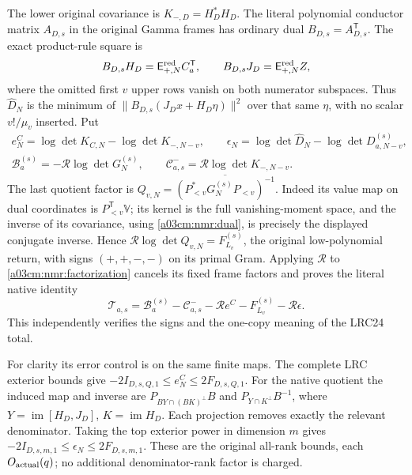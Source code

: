 \documentclass[11pt,a4paper]{article}
\begin{document}
The lower original covariance is $K_{-,D}=H_D^*H_D$.
The literal polynomial conductor matrix $A_{D,s}$ in the original
Gamma frames has ordinary dual $B_{D,s}=A_{D,s}^{\mathsf T}$.
The exact product-rule square is
\[
B_{D,s}H_D=\mathsf E_{+,N}^{\rm red}C_a^{\mathsf T},
\qquad
B_{D,s}J_D=\mathsf E_{+,N}^{\rm red}Z,
\]
where the omitted first $v$ upper rows vanish on both numerator
subspaces. Thus $\widehat D_N$ is the minimum of
$\|B_{D,s}(J_Dx+H_D\eta)\|^2$ over that same $\eta$, with no
scalar $v!/\mu_v$ inserted.
Put
\begin{equation}\tag{NMR8}\label{a03cm:nmr:corrections}
\begin{gathered}
e_N^C=\log\det K_{C,N}-\log\det K_{-,N-v},\qquad
\epsilon_N=\log\det\widehat D_N-\log\det D_{a,N-v}^{(s)},\\
\mathcal B_a^{(s)}=-\mathcal R\log\det G_N^{(s)},\qquad
\mathcal C^-_{a,s}=\mathcal R\log\det K_{-,N-v}.
\end{gathered}
\end{equation}
The last quotient factor is
$Q_{v,N}=\overline{(P_{<v}^*G_N^{(s)}P_{<v})^{-1}}$.
Indeed its value map on dual coordinates is
$P_{<v}^{\mathsf T}\mathbb V$; its kernel is the full
vanishing-moment space, and the inverse of its covariance, using
\eqref{a03cm:nmr:dual}, is precisely the displayed conjugate inverse.
Hence
$\mathcal R\log\det Q_{v,N}=F_{L_v}^{(s)}$, the original
low-polynomial return, with signs $(+,+,-,-)$ on its primal Gram.
Applying $\mathcal R$ to \eqref{a03cm:nmr:factorization} cancels its fixed
frame factors and proves the literal native identity
\begin{equation}\tag{NMR9}\label{a03cm:nmr:total}
\mathcal T_{a,s}
=\mathcal B_a^{(s)}-\mathcal C^-_{a,s}
 -\mathcal R e^C-F_{L_v}^{(s)}-\mathcal R\epsilon .
\end{equation}
This independently verifies the signs and the one-copy meaning of
the LRC24 total.

For clarity its error control is on the same finite maps. The complete
LRC exterior bounds give
$-2I_{D,s,Q,1}\leq e_N^C\leq2F_{D,s,Q,1}$.
For the native quotient the induced map and inverse are
$P_{B Y\cap(BK)^\perp}B$ and $P_{Y\cap K^\perp}B^{-1}$,
where $Y=\operatorname{im}[H_D,J_D]$, $K=\operatorname{im}H_D$.
Each projection removes exactly the relevant denominator. Taking the
top exterior power in dimension $m$ gives
$-2I_{D,s,m,1}\leq\epsilon_N\leq2F_{D,s,m,1}$.
These are the original all-rank bounds, each $O_{\rm actual}(q)$;
no additional denominator-rank factor is charged.
\end{document}
